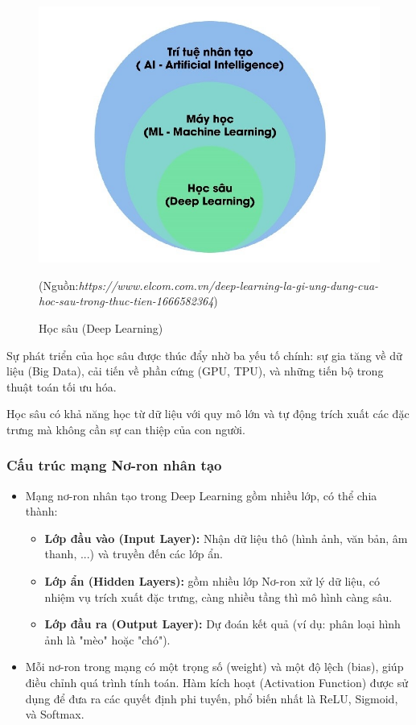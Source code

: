 \documentclass[13pt]{article}
\begin{document}
    \begin{figure}[h!]
        \centering
        \includegraphics[width=0.7\linewidth]{image/h12.jpg}
            \caption{Học sâu (Deep Learning)}
            \label{fig:label1}
            (Nguồn:\textit{https://www.elcom.com.vn/deep-learning-la-gi-ung-dung-cua-hoc-sau-trong-thuc-tien-1666582364})
    \end{figure}

Sự phát triển của học sâu được thúc đẩy nhờ ba yếu tố chính: sự gia tăng về dữ liệu (Big Data), cải tiến về phần cứng (GPU, TPU), và những tiến bộ trong thuật toán tối ưu hóa.

Học sâu có khả năng học từ dữ liệu với quy mô lớn và tự động trích xuất các đặc trưng mà không cần sự can thiệp của con người.

\subsubsection{Cấu trúc mạng Nơ-ron nhân tạo}
\begin{itemize}
    \item Mạng nơ-ron nhân tạo trong Deep Learning gồm nhiều lớp, có thể chia thành:
    \begin{itemize}
        \item \textbf{Lớp đầu vào (Input Layer): } Nhận dữ liệu thô (hình ảnh, văn bản, âm thanh, ...) và truyền đến các lớp ẩn.
        \item \textbf{Lớp ẩn (Hidden Layers): } gồm nhiều lớp Nơ-ron xử lý dữ liệu, có nhiệm vụ trích xuất đặc trưng, càng nhiều tầng thì mô hình càng sâu.
        \item \textbf{Lớp đầu ra (Output Layer): } Dự đoán kết quả (ví dụ: phân loại hình ảnh là "mèo" hoặc "chó").
    \end{itemize}
    \item Mỗi nơ-ron trong mạng có một trọng số (weight) và một độ lệch (bias), giúp điều chỉnh quá trình tính toán. Hàm kích hoạt (Activation Function) được sử dụng để đưa ra các quyết định phi tuyến, phổ biến nhất là ReLU, Sigmoid, và Softmax.
\end{itemize}
\end{document}

